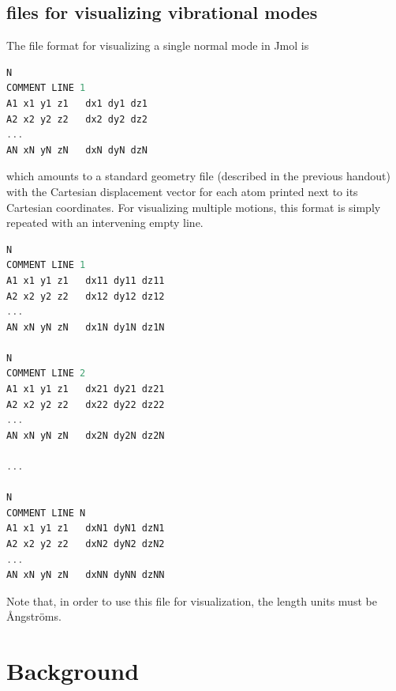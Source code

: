 \documentclass[11pt]{article}
\begin{document}
\subsection{ files for visualizing vibrational modes}
The file format for visualizing a single normal mode in Jmol is
\begin{addmargin}{5cm}{}
\begin{lstlisting}[language=c++]
N
COMMENT LINE 1
A1 x1 y1 z1   dx1 dy1 dz1
A2 x2 y2 z2   dx2 dy2 dz2
...                        
AN xN yN zN   dxN dyN dzN
\end{lstlisting}
\end{addmargin}
which amounts to a standard  geometry file (described in the previous
handout) with the Cartesian displacement vector for each atom printed next to
its Cartesian coordinates. For visualizing multiple motions, this format is
simply repeated with an intervening empty line.
\begin{addmargin}{5cm}{}
\begin{lstlisting}[language=c++]
N
COMMENT LINE 1
A1 x1 y1 z1   dx11 dy11 dz11
A2 x2 y2 z2   dx12 dy12 dz12
...                        
AN xN yN zN   dx1N dy1N dz1N
                           
N                          
COMMENT LINE 2             
A1 x1 y1 z1   dx21 dy21 dz21
A2 x2 y2 z2   dx22 dy22 dz22
...                        
AN xN yN zN   dx2N dy2N dz2N
                           
...                        
                           
N                          
COMMENT LINE N             
A1 x1 y1 z1   dxN1 dyN1 dzN1
A2 x2 y2 z2   dxN2 dyN2 dzN2
...                        
AN xN yN zN   dxNN dyNN dzNN
\end{lstlisting}
\end{addmargin}
Note that, in order to use this file for visualization, the length units must
be \AA ngstr\"oms.

\newpage
\section{Background}\label{background}
\end{document}
